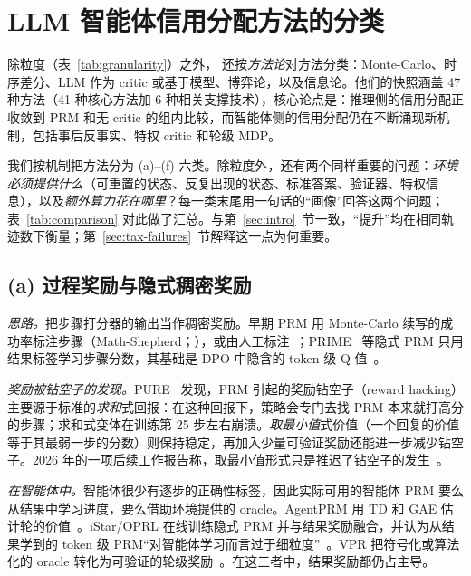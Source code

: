 \section{LLM 智能体信用分配方法的分类}\label{sec:taxonomy}

除粒度（表~\ref{tab:granularity}）之外，\citet{zhang2026from} 还按\emph{方法论}对方法分类：Monte-Carlo、时序差分、LLM 作为 critic 或基于模型、博弈论，以及信息论。他们的快照涵盖 47 种方法（41 种核心方法加 6 种相关支撑技术），核心论点是：推理侧的信用分配正收敛到 PRM 和无 critic 的组内比较，而智能体侧的信用分配仍在不断涌现新机制，包括事后反事实、特权 critic 和轮级 MDP。

我们按机制把方法分为 (a)--(f) 六类。除粒度外，还有两个同样重要的问题：\emph{环境必须提供什么}（可重置的状态、反复出现的状态、标准答案、验证器、特权信息），以及\emph{额外算力花在哪里}？每一类末尾用一句话的“画像”回答这两个问题；表~\ref{tab:comparison} 对此做了汇总。与第~\ref{sec:intro}~节一致，“提升”均在相同轨迹数下衡量；第~\ref{sec:tax-failures}~节解释这一点为何重要。

\subsection{(a) 过程奖励与隐式稠密奖励}\label{sec:tax-prm}

\emph{思路。}把步骤打分器的输出当作稠密奖励。早期 PRM 用 Monte-Carlo 续写的成功率标注步骤（Math-Shepherd；\citealp{wang2024math}\unverified），或由人工标注~\citep{lightman2023lets}\unverified；PRIME~\citep{cui2025process}\unverified{} 等隐式 PRM 只用结果标签学习步骤分数，其基础是 DPO 中隐含的 token 级 Q 值~\citep{rafailov2024from}\unverified。

\emph{奖励被钻空子的发现。}PURE~\citep{cheng2025stop} 发现，PRM 引起的奖励钻空子（reward hacking）主要源于标准的\emph{求和}式回报：在这种回报下，策略会专门去找 PRM 本来就打高分的步骤；求和式变体在训练第 25 步左右崩溃。\emph{取最小值}式价值（一个回复的价值等于其最弱一步的分数）则保持稳定，再加入少量可验证奖励还能进一步减少钻空子。2026 年的一项后续工作报告称，取最小值形式只是推迟了钻空子的发生~\citep{uprm2026unsupervised}\unverified。

\emph{在智能体中。}智能体很少有逐步的正确性标签，因此实际可用的智能体 PRM 要么从结果中学习进度，要么借助环境提供的 oracle。AgentPRM 用 TD 和 GAE 估计轮的价值~\citep{xi2025agentprm}\unverified。iStar/OPRL 在线训练隐式 PRM 并与结果奖励融合，并认为从结果学到的 token 级 PRM“对智能体学习而言过于细粒度”~\citep{istar2025online}。VPR 把符号化或算法化的 oracle 转化为可验证的轮级奖励~\citep{vpr2026verifiable}。在这三者中，结果奖励都仍占主导。

